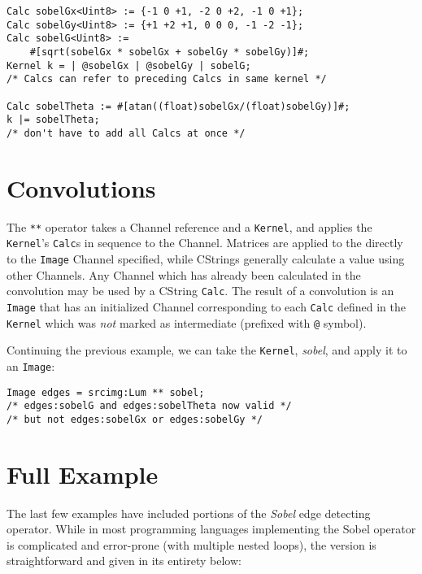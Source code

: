 \begin{lstlisting}[language=CLAM,escapechar=\%]
Calc sobelGx<Uint8> := {-1 0 +1, -2 0 +2, -1 0 +1};
Calc sobelGy<Uint8> := {+1 +2 +1, 0 0 0, -1 -2 -1};
Calc sobelG<Uint8> :=
    #[sqrt(sobelGx * sobelGx + sobelGy * sobelGy)]#;
Kernel k = | @sobelGx | @sobelGy | sobelG;
/* Calcs can refer to preceding Calcs in same kernel */

Calc sobelTheta := #[atan((float)sobelGx/(float)sobelGy)]#;
k |= sobelTheta; 
/* don't have to add all Calcs at once */
\end{lstlisting}

\section{Convolutions}\label{sec:tutorial:convolutions}

The \texttt{**} operator takes a Channel reference and a \texttt{Kernel}, and
applies the \texttt{Kernel}'s \texttt{Calc}s in sequence to the Channel.
Matrices are applied to the directly to the \texttt{Image} Channel specified,
while CStrings generally calculate a value using other Channels. Any Channel which has
already been calculated in the convolution may be used by a CString \texttt{Calc}.
The result of a convolution is an \texttt{Image} that has an initialized Channel corresponding to
each \texttt{Calc} defined in the \texttt{Kernel} which was \emph{not} marked as intermediate
(prefixed with \texttt{@} symbol).

Continuing the previous example, we can take the \texttt{Kernel}, \emph{sobel}, and apply it to an \texttt{Image}:

\begin{lstlisting}[language=CLAM,escapechar=\%]
Image edges = srcimg:Lum ** sobel;
/* edges:sobelG and edges:sobelTheta now valid */
/* but not edges:sobelGx or edges:sobelGy */
\end{lstlisting}

\clearpage
\section{Full Example}
\label{sec:tutorial:fullexample}

The last few examples have included portions of the \emph{Sobel} edge detecting operator.
While in most programming languages implementing the Sobel operator
is complicated and error-prone (with multiple nested loops), the \sys{} version is straightforward and
given in its entirety below:



